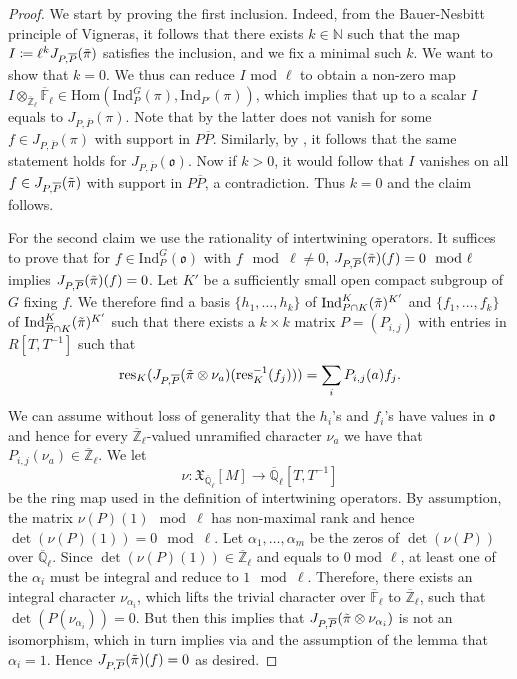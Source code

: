 \documentclass[10pt,a4paper]{amsart}
\newcommand{\bl}{\otimes_\zl\fl}
\newcommand{\fl}{{\overline{\mathbb{F}}_\ell}}
\newcommand{\fo}{\mathfrak{o}}
\newcommand{\ho}{\mathrm{Hom}}
\newcommand{\id}{\mathrm{Ind}}
\newcommand{\ip}{\mathrm{Ind}_P^G}
\newcommand{\ipp}{\id_{P'}}
\newcommand{\op}{\overline{P}}
\newcommand{\ql}{{\overline{\mathbb{Q}}_\ell}}
\newcommand{\ra}{\rightarrow}
\newcommand{\res}{\mathrm{res}}
\newcommand{\tpi}{\Tilde{\pi}}
\newcommand{\xc}{\mathfrak{X}}
\newcommand{\zl}{{\overline{\mathbb{Z}}_\ell}}
\begin{document}
\begin{proof}
We start by proving the first inclusion. Indeed, from the Bauer-Nesbitt principle of Vigneras, it follows that there exists $k\in\mathbb{N}$ such that the map $I\coloneqq \ell^kJ_{P,\overline{P}}(\tpi)$ satisfies the inclusion, and we fix a minimal such $k$. We want to show that $k=0$. We thus can reduce $I$ mod $\ell$ to obtain a non-zero map $I\bl\in \ho(\ip(\pi),\ipp(\pi))$, which implies that up to a scalar $I$ equals to $J_{P,\overline{P}}(\pi)$. Note that by  the latter does not vanish for some $f\in J_{P,\overline{P}}(\pi)$ with support in $P\op$. Similarly, by , it follows that the same statement holds for $J_{P,\overline{P}}(\fo)$. Now if $k>0$, it would follow that $I$ vanishes on all $f\in J_{P,\overline{P}}(\tpi)$ with support in $P\op$, a contradiction. Thus $k=0$ and the claim follows.

For the second claim we use  the rationality of intertwining operators. It suffices to prove that for $f\in \ip(\fo)$ with $f\mod\ell\neq 0$, $J_{P,\overline{P}}(\tpi)(f)=0\mod \ell$ implies $J_{P,\op}(\tpi)(f)=0$. 
Let $K'$ be a sufficiently small open compact subgroup of $G$ fixing $f$.
We therefore find a basis $\{h_1,\ldots,h_k\}$ of $\id_{P\cap K}^K(\tpi)^{K'}$  and $\{f_1,\ldots,f_k\}$ of $\id_{\op\cap K}^K(\tpi)^{K'}$
such that there exists a $k\times k$ matrix $P=(P_{i,j})$ with entries in $R[T,T^{-1}]$ such that \[\res_K(J_{P,\op}(\tpi\otimes\nu_a)(\res_K^{-1}(f_j)))=\sum_iP_{i,j}(a)f_j.\]
We can assume without loss of generality that the $h_i$'s and $f_i$'s have values in $\fo$ and hence for every $\zl$-valued unramified character $\nu_a$ we have that $P_{i,j}(\nu_a)\in\zl$.
We let \[\nu\colon \xc_\ql[M]\ra \ql[T,T^{-1}]\] be the ring map used in the definition of intertwining operators.
 By assumption, the matrix $\nu(P)(1)\mod \ell$ has non-maximal rank and hence $\det(\nu(P)(1))=0\mod\ell$.
 Let $\alpha_1,\ldots,\alpha_m$ be the zeros of $\det(\nu(P))$ over $\ql$. Since $\det(\nu(P)(1))\in \zl$ and equals to $0$ mod $\ell$, at least one of the $\alpha_i$  must be integral and reduce to $1\mod \ell$.
 Therefore, there exists an integral character $\nu_{\alpha_i} $, which lifts the trivial character over $\fl$ to $\zl$, such that $\det(P(\nu_{\alpha_i}))=0$. But then this implies that $J_{P,\op}(\tpi\otimes\nu_{\alpha_i})$ is not an
  isomorphism, which in turn implies via  and the assumption of the lemma that $\alpha_i=1$.
  Hence $J_{P,\op}(\tpi)(f)=0$ as desired. 
\end{proof}
\end{document}

